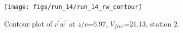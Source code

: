 \begin{figure}[H]
\centering
\texttt{[image: figs/run\_14/run\_14\_rw\_contour]}
\caption{Contour plot of $\overline{r^\prime w^\prime}$ at $z/c$=6.97, $V_{free}$=21.13, station 2.}
\label{fig:run_14_rw_contour}
\end{figure}


